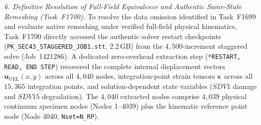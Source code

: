 \textit{6. Definitive Resolution of Full-Field Equivalence and Authentic Same-State Remeshing (Task~F1700).}
To resolve the data omission identified in Task~F1699 and evaluate native remeshing under verified full-field physical kinematics, Task~F1700 directly accessed the authentic solver restart checkpoints (\texttt{PK\_SEC43\_STAGGERED\_JOB1.stt}, $2.2\,\mathrm{GB}$) from the $4{,}500$-increment staggered solve (Job~1421286). A dedicated zero-overhead extraction step (\texttt{*RESTART, READ, END STEP}) recovered the complete internal displacement vectors $\mathbf{u}_{\mathrm{UEL}}(x, y)$ across all $4{,}040$ nodes, integration-point strain tensors $\boldsymbol{\varepsilon}$ across all $15{,}365$ integration points, and solution-dependent state variables ($SDV1$ damage and $SDV15$ degradation). The $4{,}040$ extracted nodes comprise $4{,}039$ physical continuum specimen nodes (Nodes 1--4039) plus the kinematic reference point node (Node 4040, \texttt{Nset=N\_RP}).
